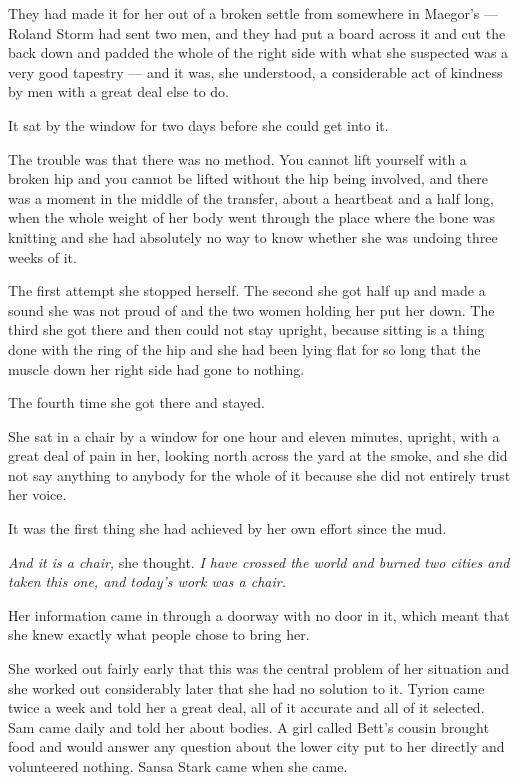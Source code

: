 They had made it for her out of a broken settle from somewhere in Maegor’s — Roland Storm had sent two men, and they had put a board across it and cut the back down and padded the whole of the right side with what she suspected was a very good tapestry — and it was, she understood, a considerable act of kindness by men with a great deal else to do.

It sat by the window for two days before she could get into it.

The trouble was that there was no method. You cannot lift yourself with a broken hip and you cannot be lifted without the hip being involved, and there was a moment in the middle of the transfer, about a heartbeat and a half long, when the whole weight of her body went through the place where the bone was knitting and she had absolutely no way to know whether she was undoing three weeks of it.

The first attempt she stopped herself. The second she got half up and made a sound she was not proud of and the two women holding her put her down. The third she got there and then could not stay upright, because sitting is a thing done with the ring of the hip and she had been lying flat for so long that the muscle down her right side had gone to nothing.

The fourth time she got there and stayed.

She sat in a chair by a window for one hour and eleven minutes, upright, with a great deal of pain in her, looking north across the yard at the smoke, and she did not say anything to anybody for the whole of it because she did not entirely trust her voice.

It was the first thing she had achieved by her own effort since the mud.

\textit{And it is a chair,} she thought. \textit{I have crossed the world and burned two cities and taken this one, and today’s work was a chair.}

\sceneBreak

Her information came in through a doorway with no door in it, which meant that she knew exactly what people chose to bring her.

She worked out fairly early that this was the central problem of her situation and she worked out considerably later that she had no solution to it. Tyrion came twice a week and told her a great deal, all of it accurate and all of it selected. Sam came daily and told her about bodies. A girl called Bett’s cousin brought food and would answer any question about the lower city put to her directly and volunteered nothing. Sansa Stark came when she came.

